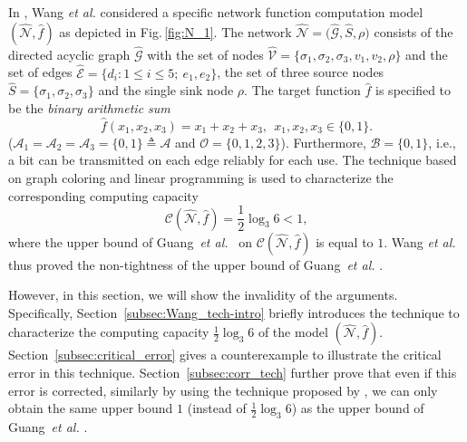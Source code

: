 \documentclass[11pt,draftclsnofoot,onecolumn]{IEEEtran}
\begin{document}
\begin{journalonly}
{In \cite{Wang-Tightness_upper_bound}, Wang \emph{et al.} considered a
specific network function computation   model  $(\widehat{\mathcal{N}},\widehat{f})$ as depicted in Fig.\,\ref{fig:N_1}.
The network $\widehat{\mathcal{N}}=\big(\widehat{\mathcal{G}},\widehat{S},\rho\big)$ consists of the directed acyclic graph  $\widehat{\mathcal{G}}$ with the set of nodes $\widehat{\mathcal{V}}=\{\sigma_1,\sigma_2,\sigma_3,v_1,v_2,\rho\}$ and the set of edges $\widehat{\mathcal{E}}=\{d_i:1\leq i\leq 5;~e_1,e_2\}$, the set of three source nodes
$\widehat{S}=\{\sigma_{1},\sigma_{2},\sigma_{3}\}$ and the single sink node $\rho$. The target function $\widehat{f}$ is specified to be the  \emph{binary arithmetic sum}
\begin{equation*}
\widehat{f}(x_{1},x_{2},x_3)=x_{1}+x_{2}+x_{3},~~ x_{1},x_{2},x_{3}\in\{0,1\}.
\end{equation*}
($\mathcal{A}_{1}=\mathcal{A}_{2}=\mathcal{A}_{3}=\{0,1\}\triangleq\mathcal{A}$ and $\mathcal{O}=\{0,1,2,3\}$). Furthermore,  $\mathcal{B}=\{0,1\}$, i.e., a bit can be transmitted on each edge reliably  for each use.
 The technique based on graph coloring and linear programming  is used to characterize the corresponding
computing capacity
\begin{equation}\mathcal{C}(\widehat{\mathcal{N}},\widehat{f})=\frac{1}{2}\log_{3}6<1,
 \end{equation}
 where   the upper bound of Guang~\emph{et al.}~\cite{Guang_Improved_upper_bound} on $\mathcal{C}(\widehat{\mathcal{N}},\widehat{f})$ is equal to $1$. Wang \emph{et al.}~\cite{Wang-Tightness_upper_bound} thus proved  the non-tightness of the upper bound of Guang~\emph{et al.} \cite{Guang_Improved_upper_bound}.



However, in this section, we will show the invalidity of the arguments.
Specifically, Section~\ref{subsec:Wang_tech-intro} briefly introduces the technique   to characterize
the computing capacity $\frac{1}{2}\log_{3}6$ of the model  $(\widehat{\mathcal{N}},\widehat{f})$. Section~\ref{subsec:critical_error} gives a counterexample  to illustrate the critical error in this technique. Section~\ref{subsec:corr_tech} further prove that even if this error is corrected, similarly by using the technique proposed by \cite{Wang-Tightness_upper_bound}, we can only obtain  the same upper bound $1$ (instead of $\frac{1}{2}\log_{3}6$) as the upper bound of Guang~\emph{et al.} \cite{Guang_Improved_upper_bound}.











}
\end{journalonly}
\end{document}
